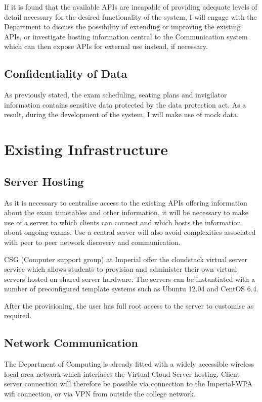 \documentclass[a4paper, 12pt, notitlepage]{report}
\begin{document}
If it is found that the available APIs are incapable of providing adequate levels of detail necessary for the desired functionality of the system, I will engage with the Department to discuss the possibility of extending or improving the existing APIs, or investigate hosting information central to the Communication system which can then expose APIs for external use instead, if necessary.

\subsection{Confidentiality of Data}

As previously stated, the exam scheduling, seating plans and invigilator information contains sensitive data protected by the data protection act.  As a result, during the development of the system, I will make use of mock data.

\section{Existing Infrastructure}

\subsection{Server Hosting}
As it is necessary to centralise access to the existing APIs offering information about the exam timetables and other information, it will be necessary to make use of a server to which clients can connect and which hosts the information about ongoing exams.  Use a central server will also avoid complexities associated with peer to peer network discovery and communication.

CSG (Computer support group) at Imperial offer the cloudstack virtual server service which allows students to provision and administer their own virtual servers hosted on shared server hardware. The servers can be instantiated with a number of preconfigured template systems such as Ubuntu 12.04 and CentOS 6.4.

After the provisioning, the user has full root access to the server to customise as required.

\subsection{Network Communication}

The Department of Computing is already fitted with a widely accessible wireless local area network which interfaces the Virtual Cloud Server hosting.  Client server connection will therefore be possible via connection to the Imperial-WPA wifi connection, or via VPN from outside the college network.
\end{document}
